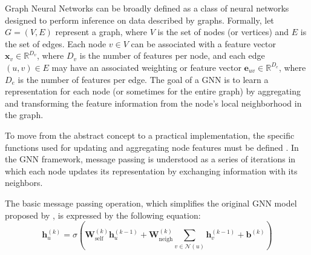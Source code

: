 Graph Neural Networks can be broadly defined as a class of neural networks designed to perform inference on data described by graphs. Formally, let \( G = (V, E) \) represent a graph, where \( V \) is the set of nodes (or vertices) and \( E \) is the set of edges. Each node \( v \in V \) can be associated with a feature vector \( \mathbf{x}_v \in \mathbb{R}^{D_v} \), where \( D_v \) is the number of features per node, and each edge \( (u, v) \in E \) may have an associated weighting or feature vector \( \mathbf{e}_{uv} \in \mathbb{R}^{D_e} \), where \( D_e \) is the number of features per edge. The goal of a GNN is to learn a representation for each node (or sometimes for the entire graph) by aggregating and transforming the feature information from the node's local neighborhood in the graph.


To move from the abstract concept to a practical implementation, the specific functions used for updating and aggregating node features must be defined \cite{Liu_Wu_Liu_Hu_2021}. In the GNN framework, message passing is understood as a series of iterations in which each node updates its representation by exchanging information with its neighbors. 

The basic message passing operation, which simplifies the original GNN model proposed by \cite{GRLB_Hamilton}, is expressed by the following equation:
\begin{equation}
 \mathbf{h}_u^{(k)} = \sigma\left( \mathbf{W}_{\text{self}}^{(k)} \mathbf{h}_u^{(k-1)} + \mathbf{W}_{\text{neigh}}^{(k)} \sum_{v \in \mathcal{N}(u)} \mathbf{h}_v^{(k-1)} + \mathbf{b}^{(k)} \right)  
    \label{eq:message_passing}
\end{equation}


